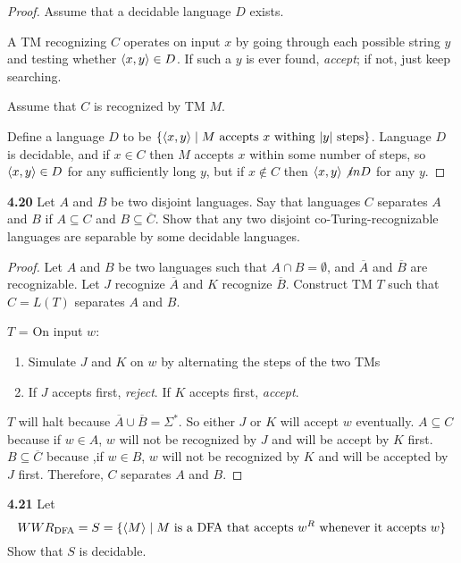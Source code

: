 \begin{mdframed}
\begin{proof}
Assume that a decidable language $D$ exists. 

A TM recognizing $C$ operates on input $x$ by going through each possible string $y$ and testing whether $\langle{x,y}\rangle\in D$. If such a $y$ is ever found, \textit{accept}; if not, just keep searching.

\medskip
Assume that $C$ is recognized by TM $M$. 

Define a language $D$ to be $\{ \langle{x, y}\rangle \mid \text{$M$ accepts $x$ withing $|y|$ steps}\}$. Language $D$ is decidable, and if $x \in C$ then $M$ accepts $x$ within some number of steps, so $\langle{x, y}\rangle \in D$ for any sufficiently long $y$, but if $x \not \in C$ then $\langle{x, y}\rangle\not in D$ for any $y$.
\end{proof}
\end{mdframed}

\textbf{4.20} Let $A$ and $B$ be two disjoint languages. Say that languages $C$ separates $A$ and $B$ if $A\subseteq C$ and $B \subseteq \overline{C}$. Show that any two disjoint co-Turing-recognizable languages are separable by some decidable languages.

\begin{mdframed}
\begin{proof}
Let $A$ and $B$ be two languages such that $A\cap B = \emptyset$, and $\overline{A}$ and $\overline{B}$ are recognizable. Let $J$ recognize $\overline{A}$ and $K$ recognize $\overline{B}$. Construct TM $T$ such that $C=L(T)$ separates $A$ and $B$.

\medskip
$T$ = On input $w$:
\begin{enumerate}
\item Simulate $J$ and $K$ on $w$ by alternating the steps of the two TMs
\item If $J$ accepts first, \textit{reject}. If $K$ accepts first, \textit{accept}.
\end{enumerate}
$T$ will halt because $\overline{A} \cup \overline{B} = \Sigma^*$. So either $J$ or $K$ will accept $w$ eventually. $A\subseteq C$ because if $w\in A$, $w$ will not be recognized by $J$ and will be accept by $K$ first. $B \subseteq \overline{C}$ because ,if $w \in B$, $w$ will not be recognized by $K$ and will be accepted by $J$ first. Therefore, $C$ separates $A$ and $B$.
\end{proof}
\end{mdframed}

\label{lang:WWRDFA_DCDB}
\textbf{4.21} Let
\[
WWR_{\text{DFA}} = S = \{ \langle{M}\rangle \mid\text{$M$ is a DFA that accepts $w^R$ whenever it accepts $w$}\}
\]
Show that $S$ is decidable.

